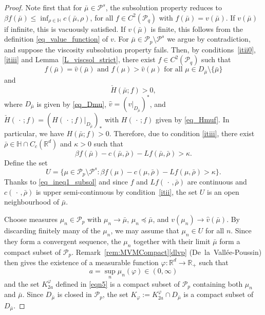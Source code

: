 \documentclass{article}
\theoremstyle{definition}
\numberwithin{equation}{section}
\numberwithin{theorem}{section}
\newcommand{\R}{\mathbb{R}}
\newcommand{\Hb}{\mathbb{H}}
\newcommand{\Pcal}{{\mathcal P}}
\newcommand{\fdot}{{\,\cdot\,}}
\begin{document}
\begin{proof}
Note first that for $\bar\mu\in\Pcal^s$, the subsolution property reduces to $\beta f(\bar\mu)\le\inf_{\rho\in \mathbb H}  c(\bar\mu,\rho)$, for all $f\in C^2(\Pcal_q)$ with $f(\bar\mu) = v(\bar\mu)$. If $v(\bar \mu)$ if infinite, this is vacuously satisfied. If $v(\bar \mu)$ is finite, this follows from the definition \eqref{eq_value_function} of $v$. For $\bar\mu\in\Pcal_p\setminus\Pcal^s$ we argue by contradiction, and suppose the viscosity subsolution property fails. Then, by conditions~\ref{itii0}, \ref{itiii} and Lemma~\ref{L_viscsol_strict}, there exist $f\in C^2(\Pcal_q)$ such that
\[
\text{$f(\bar\mu) = \hat v(\bar\mu)$ and $f(\mu) > \hat v(\mu)$ for all $\mu\in D_{\bar\mu}\setminus\{\bar\mu\}$}
\]
and
\[
\check H(\bar\mu; f) > 0,
\]
where $D_{\bar\mu}$ is given by \eqref{eq_Dmu}, $\hat v = (v|_{D_{\bar\mu}})^*$, and $\check H(\fdot; f) = (H(\fdot;f)|_{D_{\bar\mu}})_*$ with $H(\fdot;f)$ given by \eqref{eq_Hmuf}. In particular, we have $H(\bar\mu;f) > 0$. Therefore, due to condition \ref{itiii}, there exist $\bar\rho\in \Hb\cap C_c({\R^d})$ and $\kappa>0$ such that
\begin{equation}\label{eq_ineq1_subsol}
\beta f(\bar\mu) - c(\bar\mu,\bar\rho) - Lf(\bar\mu,\bar\rho) > \kappa.
\end{equation}
Define the set
\[
U = \{\mu\in\Pcal_p\setminus\Pcal^s \colon  \beta f(\mu) - c(\mu,\bar\rho) - Lf(\mu,\bar\rho) > \kappa \}.
\]
Thanks to \eqref{eq_ineq1_subsol} and since $f$ and $Lf(\fdot,\bar\rho)$ are continuous and $c(\fdot,\bar\rho)$ is upper semi-continuous by condition~\ref{itii}, the set $U$ is an open neighbourhood of $\bar\mu$.


Choose measures $\mu_n\in\Pcal_p$ with $\mu_n\to\bar\mu$, $\mu_n\preceq\bar\mu$, and $v(\mu_n)\to \hat v(\bar\mu)$. By discarding finitely many of the $\mu_n$, we may assume that $\mu_n\in U$ for all $n$. Since they form a convergent sequence, the $\mu_n$ together with their limit $\bar\mu$ form a compact subset of $\Pcal_p$. 
  Remark~\ref{rem:MVMCompact}\ref{dlvp} (De~la~Vall\'ee-Poussin) then
 gives the existence of a  measurable function $\varphi:\R^d\to\R_+$ such that
 \begin{equation}\label{eq_subsol_a_def}
a = \sup_n \mu_n(\varphi) \in (0,\infty)
\end{equation}
 and the set
$
K^\varphi_{2a} 
$
defined in \eqref{eqn5} is a compact subset of $\Pcal_p$ containing both $\mu_n$ and $\bar\mu$. Since $D_{\bar\mu}$ is closed in $\Pcal_p$, the set $K_\varphi:=K^\varphi_{2a} \cap D_{\bar\mu}$ is a compact subset of $D_{\bar\mu}$.


\end{proof}
\end{document}
